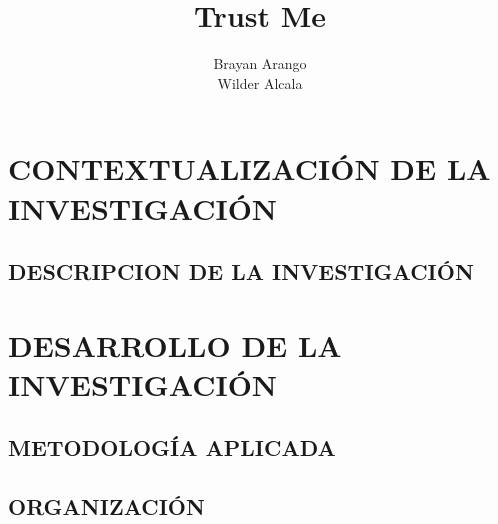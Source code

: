 \documentclass[12pt,letterpaper,oneside]{report}
\title{Trust Me}
\author{{Brayan Arango} \\ {Wilder Alcala}}
\begin{document}
	
	
	

	
	
	
	\tableofcontents
	\listoffigures
	
	
	
	\part{CONTEXTUALIZACIÓN DE LA INVESTIGACIÓN}
	
		\chapter{DESCRIPCION DE LA INVESTIGACIÓN}
			
			
			
			
			
			
			
			
	\part{DESARROLLO DE LA INVESTIGACIÓN}
		
		\chapter{METODOLOGÍA APLICADA}
			
			
			
		
		\chapter{ORGANIZACIÓN}
			
			
			
			
			
			
			
			
			
\end{document}
